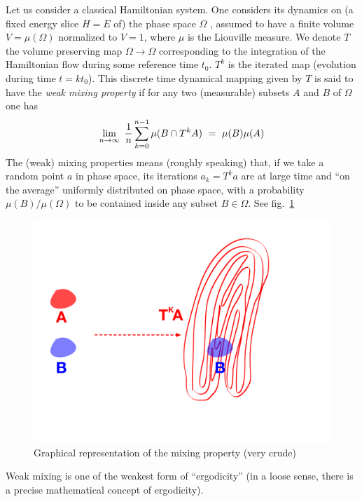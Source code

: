 Let us consider a classical Hamiltonian system. One considers its dynamics on (a fixed energy slice $H=E$ of) the phase space $\Omega$ , assumed to have a finite volume $V=\mu(\Omega)$ normalized to $V=1$,  where $\mu$ is the Liouville measure. 
We denote $T$ the volume preserving  map $\Omega\to\Omega$ corresponding to the integration of the Hamiltonian flow during some reference time $t_0$. $T^k$ is the iterated map (evolution during time $t=k t_0$). This discrete time dynamical mapping given by $T$ is said to have the \emph{weak mixing property} if for any two (measurable) subsets $A$ and $B$ of $\Omega$ one has
\begin{equation}
\label{ }
\lim_{n\to\infty} \  {1\over n}\sum_{k=0}^{n-1} \mu(B\cap T^k A)  \ =\ \mu(B)\mu(A)
\end{equation}
The (weak) mixing properties means (roughly speaking)  that, if we take a random point $a$  in phase space, its iterations $a_k=T^k a$ are at large time and ``on the average'' uniformly distributed on phase space, with a probability $\mu(B)/\mu(\Omega)$ to be contained inside any subset $B\in\Omega$.
See fig.~\ref{fWMixing}
\begin{figure}[h]
\begin{center}
\includegraphics[height=2.in]{Mixing.pdf}
\caption{Graphical representation of the mixing property (very crude)}
\label{fWMixing}
\end{center}
\end{figure}

Weak mixing is one of the weakest form of ``ergodicity'' (in a loose sense, there is a precise mathematical concept of ergodicity).

